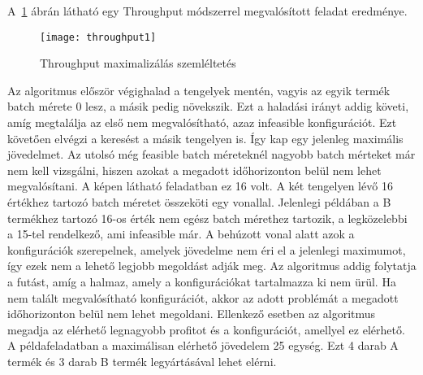 A~\ref{throughput1} ábrán látható egy Throughput módszerrel megvalósított feladat eredménye.
\begin{figure}[H]
\begin{center}
\texttt{[image: throughput1]}
\caption{Throughput maximalizálás szemléltetés}
\label{throughput1}
\end{center}
\end{figure}
Az algoritmus először végighalad a tengelyek mentén, vagyis az egyik termék batch mérete 0 lesz, a másik pedig növekszik. Ezt a haladási irányt addig követi, amíg megtalálja az első nem megvalósítható, azaz infeasible konfigurációt. Ezt követően elvégzi a keresést a másik tengelyen is. Így kap egy jelenleg maximális jövedelmet. Az utolsó még feasible batch méreteknél nagyobb batch mérteket már nem kell vizsgálni, hiszen azokat a megadott időhorizonton belül nem lehet megvalósítani. A képen látható feladatban ez 16 volt. A két tengelyen lévő 16 értékhez tartozó batch méretet összeköti egy vonallal. Jelenlegi példában a B termékhez tartozó 16-os érték nem egész batch mérethez tartozik, a legközelebbi a 15-tel rendelkező, ami infeasible már. A behúzott vonal alatt azok a konfigurációk szerepelnek, amelyek jövedelme nem éri el a jelenlegi maximumot, így ezek nem a lehető legjobb megoldást adják meg. Az algoritmus addig folytatja a futást, amíg a halmaz, amely a konfigurációkat tartalmazza ki nem ürül. Ha nem talált megvalósítható konfigurációt, akkor az adott problémát a megadott időhorizonton belül nem lehet megoldani. Ellenkező esetben az algoritmus megadja az elérhető legnagyobb profitot és a konfigurációt, amellyel ez elérhető. A példafeladatban a maximálisan elérhető jövedelem 25 egység. Ezt 4 darab A termék és 3 darab B termék legyártásával lehet elérni.